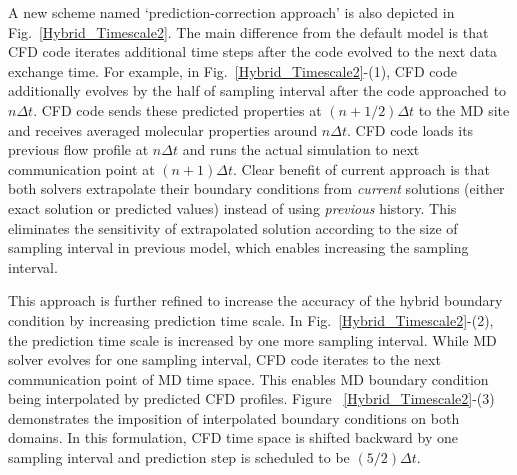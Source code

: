 \documentclass[preprint,12pt]{elsarticle}
\begin{document}
A new scheme named `prediction-correction approach' is also depicted in Fig.~\ref{Hybrid_Timescale2}. The main difference from the default model is that CFD code iterates additional  time steps after the code evolved to the next data exchange time. For example, in Fig.~\ref{Hybrid_Timescale2}-(1), CFD code additionally evolves by the half of sampling interval after the code approached to $n{\Delta}t$. CFD code sends these predicted properties at $(n+1/2){\Delta}t$ to the MD site and receives averaged molecular properties around $n{\Delta}t$. CFD code loads its previous flow profile at $n{\Delta}t$ and runs the actual simulation to next communication point at $(n+1){\Delta}t$. Clear benefit of current approach is that both solvers extrapolate their boundary conditions from \textit{current} solutions (either exact solution or predicted values) instead of using \textit{previous} history. This eliminates the sensitivity of extrapolated solution according to the size of sampling interval in previous model, which enables increasing the sampling interval. 

This approach is further refined to increase the accuracy of the hybrid boundary condition by increasing prediction time scale. In Fig.~\ref{Hybrid_Timescale2}-(2), the prediction time scale is increased by one more sampling interval. While MD solver evolves for one sampling interval, CFD code iterates to the next communication point of MD time space. This enables MD boundary condition being interpolated by predicted CFD profiles. Figure ~\ref{Hybrid_Timescale2}-(3) demonstrates the imposition of interpolated boundary conditions on both domains. In this formulation, CFD time space is shifted backward by one sampling interval and prediction step is scheduled to be $(5/2){\Delta}t$. 
\end{document}
